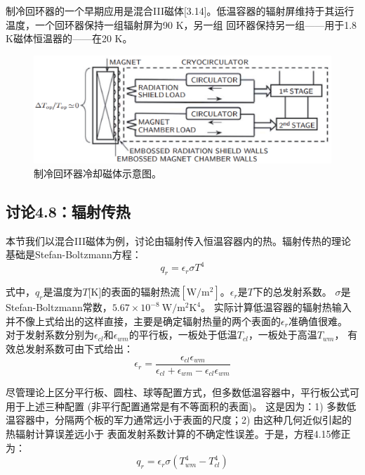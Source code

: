制冷回环器的一个早期应用是混合III磁体[3.14]。低温容器的辐射屏维持于其运行温度，一个回环器保持一组辐射屏为90 K，另一组
回环器保持另一组——用于1.8 K磁体恒温器的——在20 K。

\begin{figure}[htbp]
	\centering
	\includegraphics[scale=0.6]{chpt4/figs/fig4.15.eps}
	\caption{制冷回环器冷却磁体示意图。}
\end{figure}



\subsection{讨论4.8：辐射传热}
本节我们以混合III磁体为例，讨论由辐射传入恒温容器内的热。辐射传热的理论基础是Stefan-Boltzmann方程：
\begin{equation}%
q_r=\epsilon_r\sigma T^4
\end{equation}

式中，$q_r$是温度为$T$[K]的表面的辐射热流$[\mathrm{W/m^2}]$。$\epsilon_r$是$T$下的总发射系数。
$\sigma$是Stefan-Boltzmann常数，$5.67\times 10^{-8}\ \mathrm{W/m^2 K^4}$。
实际计算低温容器的辐射热输入并不像上式给出的这样直接，主要是确定辐射热量的两个表面的$\epsilon_r$准确值很难。
对于发射系数分别为$\epsilon_{cl}$和$\epsilon_{wm}$的平行板，一板处于低温$T_{cl}$，一板处于高温$T_{wm}$，
有效总发射系数可由下式给出：
\begin{equation}%
\epsilon_r=\frac{\epsilon_{cl}\epsilon_{wm}}{\epsilon_{cl}+\epsilon_{wm}-\epsilon_{cl}\epsilon_{wm}}
\end{equation}

尽管理论上区分平行板、圆柱、球等配置方式，但多数低温容器中，平行板公式可用于上述三种配置
(非平行配置通常是有不等面积的表面)。
这是因为：1) 多数低温容器中，分隔两个板的军力通常远小于表面的尺度；2) 由这种几何近似引起的热辐射计算误差远小于
表面发射系数计算的不确定性误差。于是，方程4.15修正为：
\begin{equation}%
q_r=\epsilon_r\sigma(T_{wm}^4-T_{cl}^4)
\end{equation}

